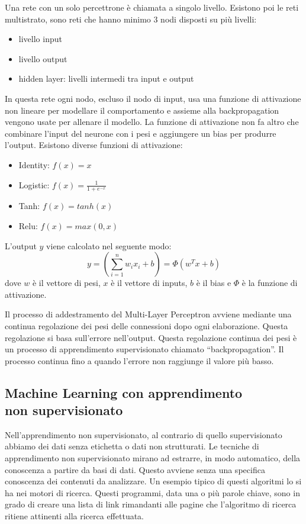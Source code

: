 \documentclass[12pt,italian]{report}
\begin{document}
Una rete con un solo percettrone è chiamata a singolo livello. Esistono poi le reti multistrato, sono reti che hanno minimo 3 nodi disposti su più livelli:
\begin{itemize}
	\item livello input
	\item livello output 
	\item hidden layer: livelli intermedi tra input e output 
\end{itemize}
In questa rete ogni nodo, escluso il nodo di input, usa una funzione di attivazione non lineare per modellare il comportamento e assieme alla backpropagation vengono usate per allenare il modello.
La funzione di attivazione non fa altro che combinare l'input del neurone con i pesi e aggiungere un bias per produrre l'output.
Esistono diverse funzioni di attivazione:
\begin{itemize}
	\item Identity: $f(x) = x$
	\item Logistic: $f(x) = \frac{1}{1 + e^{-x}}$
	\item Tanh: $f(x) = tanh(x)$
	\item Relu: $f(x) = max(0, x)$
\end{itemize}
L'output $y$ viene calcolato nel seguente modo: 
\begin{equation}
y = ( \sum_{i=1}^{n}w_ix_i + b) = \Phi (w^{T}x + b)
\end{equation}
dove $w$ è il vettore di pesi, $x$ è il vettore di inputs, $b$ è il bias e $\Phi$ è la funzione di attivazione.

Il processo di addestramento del Multi-Layer Perceptron avviene mediante una continua regolazione dei pesi delle connessioni dopo ogni elaborazione. Questa regolazione si basa sull'errore nell'output. Questa regolazione continua dei pesi è un processo di apprendimento supervisionato chiamato ``backpropagation''.
Il processo continua fino a quando l'errore non raggiunge il valore più basso.
\subsection{Machine Learning con apprendimento\\ non supervisionato}
Nell’apprendimento non supervisionato, al contrario di quello supervisionato abbiamo dei dati senza etichetta o dati non strutturati. Le tecniche di apprendimento non supervisionato mirano ad estrarre, in modo automatico, della conoscenza a partire da basi di dati. Questo avviene senza una specifica conoscenza dei contenuti da analizzare. Un esempio tipico di questi algoritmi lo si ha nei motori di ricerca. Questi programmi, data una o più parole chiave, sono in grado di creare una lista di link rimandanti alle pagine che l'algoritmo di ricerca ritiene attinenti alla ricerca effettuata.
\end{document}
